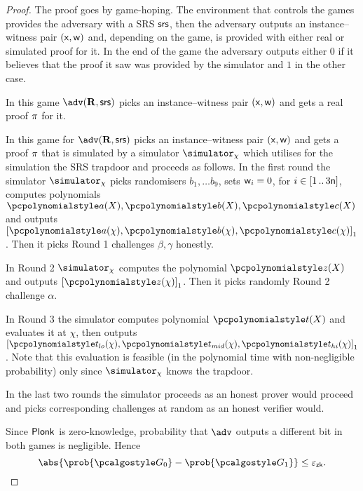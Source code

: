 \documentclass[runningheads,10pt]{llncs}
\begin{document}
\begin{proof}
  
  The proof goes by game-hoping. The environment that controls the games
  provides the adversary with a SRS $\mathsf{srs}$, then the adversary outputs an
  instance--witness pair $(\mathsf{x}, \mathsf{w})$ and, depending on the game, is provided
  with either real or simulated proof for it. In the end of the game the
  adversary outputs either $0$ if it believes that the proof it saw was provided
  by the simulator and $1$ in the other case.

   In this game $\adv(\REL, \srs)$ picks an instance--witness pair
  $(\mathsf{x}, \mathsf{w})$ and gets a real proof $\pi$ for it.

   In this game for $\adv(\REL, \srs)$ picks an instance--witness pair
  $(\mathsf{x}, \mathsf{w})$ and gets a proof $\pi$ that is simulated by a simulator
  $\simulator_\chi$ which utilises for the simulation the SRS trapdoor and
  proceeds as follows. In the first round the simulator $\simulator_\chi$ picks
  randomisers $b_1, \ldots b_9$, sets $\mathsf{w}_i = 0$, for $i \in [1 \, .. \, 3
    \mathsf{n}]$, computes polynomials $\pa(X), \pb(X), \pc(X)$ and
  outputs $\gone{\pa(\chi), \pb(\chi), \pc(\chi)}$. Then it picks Round 1
  challenges $\beta, \gamma$ honestly.

  In Round 2 $\simulator_\chi$ computes the polynomial $\pz(X)$ and
  outputs $\gone{\pz(\chi)}$. Then it picks randomly Round 2 challenge $\alpha$.

  In Round 3 the simulator computes polynomial $\pt(X)$ and evaluates it
  at $\chi$, then outputs $\gone{\ptlo(\chi), \ptmid(\chi), \pthi(\chi)}$. Note
  that this evaluation is feasible (in the polynomial time with non-negligible
  probability) only since $\simulator_\chi$ knows the trapdoor.

  In the last two rounds the simulator proceeds as an honest prover would
  proceed and picks corresponding challenges at random as an honest verifier
  would.

   Since $\textnormal{\textsf{Plonk}}$ is zero-knowledge,
  probability that $\adv$ outputs a different bit in both games is negligible.
  Hence
  \[
	\abs{\prob{\game{0}} - \prob{\game{1}}} \leq \epszk.
\]


\end{proof}
\end{document}
